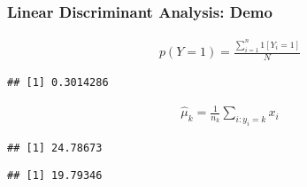 \documentclass[
  shownotes,
  xcolor={svgnames},
  hyperref={colorlinks,citecolor=DarkBlue,linkcolor=DarkRed,urlcolor=DarkBlue}
  , aspectratio=169]{beamer}
\newenvironment{Shaded}{\begin{snugshade}}{\end{snugshade}}
\newcommand{\DecValTok}[1]{\textcolor[rgb]{0.00,0.00,0.81}{#1}}
\newcommand{\KeywordTok}[1]{\textcolor[rgb]{0.13,0.29,0.53}{\textbf{#1}}}
\newcommand{\NormalTok}[1]{#1}
\newcommand{\OperatorTok}[1]{\textcolor[rgb]{0.81,0.36,0.00}{\textbf{#1}}}
\begin{document}
\begin{frame}[fragile]
\frametitle{Linear Discriminant Analysis: Demo}
\begin{scriptsize}
\begin{align}
    p(Y=1) = \frac{\sum_{i=1}^n 1[Y_i=1]}{N}
  \end{align}


\begin{Shaded}
\end{Shaded}
\begin{verbatim}
## [1] 0.3014286
\end{verbatim}
\end{scriptsize}
\begin{scriptsize}
\begin{align}
\hat{\mu}_k=\frac{1}{n_k}\sum_{i:y_i=k}x_i
\end{align}


\begin{Shaded}
\end{Shaded}

\begin{verbatim}
## [1] 24.78673
\end{verbatim}

\begin{Shaded}
\end{Shaded}

\begin{verbatim}
## [1] 19.79346
\end{verbatim}
\end{scriptsize}

\end{frame}
\end{document}
